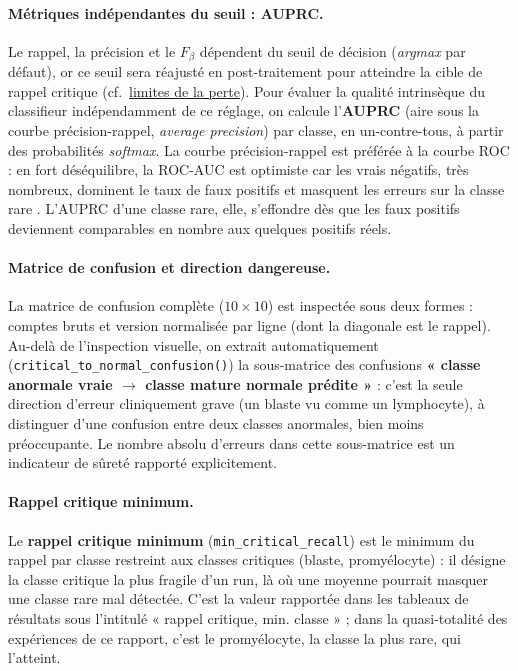 \paragraph{Métriques indépendantes du seuil : AUPRC.} Le rappel, la précision et le $F_\beta$ dépendent du seuil de décision (\emph{argmax} par défaut), or ce seuil sera réajusté en post-traitement pour atteindre la cible de rappel critique (cf.\ \hyperref[sec:limites-loss]{limites de la perte}).
Pour évaluer la qualité intrinsèque du classifieur indépendamment de ce réglage, on calcule l'\textbf{AUPRC} (aire sous la courbe précision-rappel, \emph{average precision}) par classe, en un-contre-tous, à partir des probabilités \emph{softmax}.
La courbe précision-rappel est préférée à la courbe ROC : en fort déséquilibre, la ROC-AUC est optimiste car les vrais négatifs, très nombreux, dominent le taux de faux positifs et masquent les erreurs sur la classe rare \parencite{saito2015prc}.
L'AUPRC d'une classe rare, elle, s'effondre dès que les faux positifs deviennent comparables en nombre aux quelques positifs réels.

\paragraph{Matrice de confusion et direction dangereuse.} La matrice de confusion complète ($10 \times 10$) est inspectée sous deux formes : comptes bruts et version normalisée par ligne (dont la diagonale est le rappel).
Au-delà de l'inspection visuelle, on extrait automatiquement (\texttt{critical\_\allowbreak to\_\allowbreak normal\_\allowbreak confusion()}) la sous-matrice des confusions \textbf{« classe anormale vraie $\rightarrow$ classe mature normale prédite »} : c'est la seule direction d'erreur cliniquement grave (un blaste vu comme un lymphocyte), à distinguer d'une confusion entre deux classes anormales, bien moins préoccupante.
Le nombre absolu d'erreurs dans cette sous-matrice est un indicateur de sûreté rapporté explicitement.

\paragraph{Rappel critique minimum.} Le \textbf{rappel critique minimum} (\texttt{min\_critical\_recall}) est le minimum du rappel par classe restreint aux classes critiques (blaste, promyélocyte) : il désigne la classe critique la plus fragile d'un run, là où une moyenne pourrait masquer une classe rare mal détectée.
C'est la valeur rapportée dans les tableaux de résultats sous l'intitulé « rappel critique, min. classe » ; dans la quasi-totalité des expériences de ce rapport, c'est le promyélocyte, la classe la plus rare, qui l'atteint.

